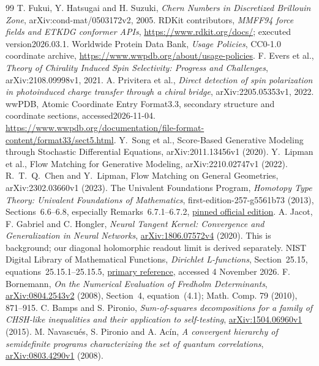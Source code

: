 \documentclass[11pt,oneside,openany]{book}
\theoremstyle{definition}\newtheorem{definition}[theorem]{Definition}
\theoremstyle{remark}\newtheorem{remark}[theorem]{Remark}
\begin{document}
\begin{thebibliography}{99}
 T. Fukui, Y. Hatsugai and H. Suzuki,
\emph{Chern Numbers in Discretized Brillouin Zone},
arXiv:cond-mat/0503172v2, 2005.
 RDKit contributors,
\emph{MMFF94 force fields and ETKDG conformer APIs},
\url{https://www.rdkit.org/docs/}; executed version2026.03.1.
 Worldwide Protein Data Bank,
\emph{Usage Policies}, CC0-1.0 coordinate archive,
\url{https://www.wwpdb.org/about/usage-policies}.
 F. Evers et al.,
\emph{Theory of Chirality Induced Spin Selectivity: Progress and Challenges},
arXiv:2108.09998v1, 2021.
 A. Privitera et al.,
\emph{Direct detection of spin polarization in photoinduced charge transfer
through a chiral bridge}, arXiv:2205.05353v1, 2022.
 wwPDB, Atomic Coordinate Entry Format3.3, secondary structure and coordinate sections, accessed2026-11-04. \url{https://www.wwpdb.org/documentation/file-format-content/format33/sect5.html}.
 Y.~Song et al., Score-Based Generative Modeling through Stochastic Differential Equations, arXiv:2011.13456v1 (2020).
 Y.~Lipman et al., Flow Matching for Generative Modeling, arXiv:2210.02747v1 (2022).
 R.~T.~Q.~Chen and Y.~Lipman, Flow Matching on General Geometries, arXiv:2302.03660v1 (2023).
 The Univalent Foundations Program, \emph{Homotopy Type Theory: Univalent Foundations of Mathematics}, first-edition-257-g5561b73 (2013), Sections~6.6--6.8, especially Remarks~6.7.1--6.7.2, \href{https://homotopytypetheory.org/wp-content/uploads/2013/03/hott-online-257-g5561b73.pdf}{pinned official edition}.
 A. Jacot, F. Gabriel and C. Hongler, \emph{Neural Tangent Kernel: Convergence and Generalization in Neural Networks}, \href{https://arxiv.org/abs/1806.07572v4}{arXiv:1806.07572v4} (2020). This is background; our diagonal holomorphic readout limit is derived separately.
 NIST Digital Library of Mathematical Functions, \emph{Dirichlet L-functions}, Section~25.15, equations~25.15.1--25.15.5, \href{https://dlmf.nist.gov/25.15}{primary reference}, accessed 4 November 2026.
 F. Bornemann, \emph{On the Numerical Evaluation of Fredholm Determinants}, \href{https://arxiv.org/abs/0804.2543v2}{arXiv:0804.2543v2} (2008), Section~4, equation~(4.1); Math. Comp. 79 (2010), 871--915.
 C. Bamps and S. Pironio, \emph{Sum-of-squares decompositions for a family of CHSH-like inequalities and their application to self-testing}, \href{https://arxiv.org/abs/1504.06960v1}{arXiv:1504.06960v1} (2015).
 M. Navascu\'es, S. Pironio and A. Ac\'in, \emph{A convergent hierarchy of semidefinite programs characterizing the set of quantum correlations}, \href{https://arxiv.org/abs/0803.4290v1}{arXiv:0803.4290v1} (2008).

\end{thebibliography}
\end{document}
